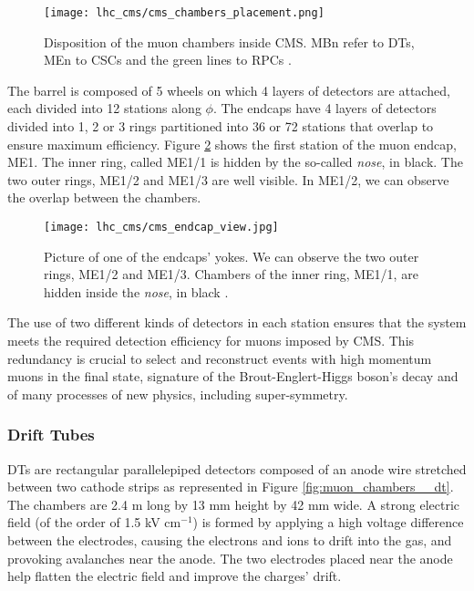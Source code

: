             \begin{figure}[h!]
                \centering
                \texttt{[image: lhc\_cms/cms\_chambers\_placement.png]}
                \caption{Disposition of the muon chambers inside CMS. MBn refer to DTs, MEn to CSCs and the green lines to RPCs \Cite{CMS_Upgrades}.}
                \label{fig:muon_chambers__placement}
            \end{figure}    

            The barrel is composed of 5 wheels on which 4 layers of detectors are attached, each divided into 12 stations along $ \phi $. The endcaps have 4 layers of detectors divided into 1, 2 or 3 rings partitioned into 36 or 72 stations that overlap to ensure maximum efficiency. Figure \ref{fig:muon_chambers__cms_endcap} shows the first station of the muon endcap, ME1. The inner ring, called ME1/1 is hidden by the so-called \emph{nose}, in black. The two outer rings, ME1/2 and ME1/3 are well visible. In ME1/2, we can observe the overlap between the chambers. \\

            \begin{figure}[p!]
                \centering
                \texttt{[image: lhc\_cms/cms\_endcap\_view.jpg]}
                \caption{Picture of one of the endcaps' yokes. We can observe the two outer rings, ME1/2 and ME1/3. Chambers of the inner ring, ME1/1, are hidden inside the \emph{nose}, in black \Cite{Fig_CMS_Endcap}.}
                \label{fig:muon_chambers__cms_endcap}
            \end{figure}    

            The use of two different kinds of detectors in each station ensures that the system meets the required detection efficiency for muons imposed by CMS. This redundancy is crucial to select and reconstruct events with high momentum muons in the final state, signature of the Brout-Englert-Higgs boson's decay and of many processes of new physics, including super-symmetry.

            \subsubsection{Drift Tubes}

                DTs are rectangular parallelepiped detectors composed of an anode wire stretched between two cathode strips as represented in Figure \ref{fig:muon_chambers__dt}. The chambers are 2.4 m long by 13 mm height by 42 mm wide. A strong electric field (of the order of 1.5 kV cm$ ^{-1} $) is formed by applying a high voltage difference between the electrodes, causing the electrons and ions to drift into the gas, and provoking avalanches near the anode. The two electrodes placed near the anode help flatten the electric field and improve the charges' drift. \\

